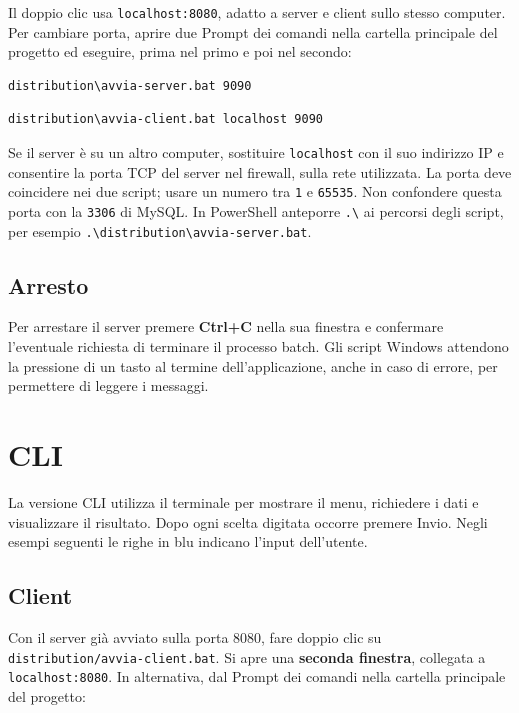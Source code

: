 \documentclass[11pt,a4paper]{article}
\begin{document}
Il doppio clic usa \texttt{localhost:8080}, adatto a server e client sullo
stesso computer. Per cambiare porta, aprire due Prompt dei comandi nella
cartella principale del progetto ed eseguire, prima nel primo e poi nel secondo:
\begin{lstlisting}
distribution\avvia-server.bat 9090
\end{lstlisting}
\begin{lstlisting}
distribution\avvia-client.bat localhost 9090
\end{lstlisting}

Se il server è su un altro computer, sostituire \texttt{localhost} con il suo
indirizzo IP e consentire la porta TCP del server nel firewall, sulla rete
utilizzata. La porta deve coincidere nei due script; usare un numero tra
\texttt{1} e \texttt{65535}. Non confondere questa porta con la \texttt{3306}
di MySQL. In PowerShell anteporre \texttt{.\textbackslash} ai percorsi degli
script, per esempio \texttt{.\textbackslash distribution\textbackslash avvia-server.bat}.

\subsection*{Arresto}

Per arrestare il server premere \textbf{Ctrl+C} nella sua finestra e confermare
l'eventuale richiesta di terminare il processo batch. Gli script Windows
attendono la pressione di un tasto al termine dell'applicazione, anche in caso
di errore, per permettere di leggere i messaggi.

\clearpage
\section*{CLI}

La versione CLI utilizza il terminale per mostrare il menu, richiedere i dati e
visualizzare il risultato. Dopo ogni scelta digitata occorre premere Invio.
Negli esempi seguenti le righe in \textcolor{MAPinput}{blu} indicano l'input
dell'utente.

\subsection*{Client}

Con il server già avviato sulla porta 8080, fare doppio clic su
\texttt{distribution/avvia-client.bat}. Si apre una \textbf{seconda finestra},
collegata a \texttt{localhost:8080}. In alternativa, dal Prompt dei comandi
nella cartella principale del progetto:
\end{document}
